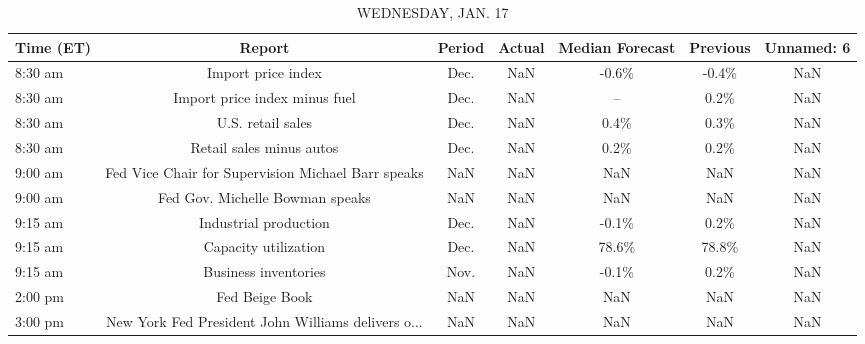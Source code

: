 \documentclass{article}%
\begin{document}
\begin{table}[htbp]%
\caption{WEDNESDAY, JAN. 17}%
\centering%
\begin{adjustbox}{width=1\textwidth}%
\begin{tabular}{lcccccc}
\toprule
Time (ET) &                                             Report & Period & Actual & Median Forecast & Previous & Unnamed: 6 \\
\midrule
  8:30 am &                                 Import price index &   Dec. &    NaN &           -0.6\% &    -0.4\% &        NaN \\
  8:30 am &                      Import price index minus fuel &   Dec. &    NaN &              -- &     0.2\% &        NaN \\
  8:30 am &                                  U.S. retail sales &   Dec. &    NaN &            0.4\% &     0.3\% &        NaN \\
  8:30 am &                           Retail sales minus autos &   Dec. &    NaN &            0.2\% &     0.2\% &        NaN \\
  9:00 am & Fed Vice Chair for Supervision Michael Barr speaks &    NaN &    NaN &             NaN &      NaN &        NaN \\
  9:00 am &                    Fed Gov. Michelle Bowman speaks &    NaN &    NaN &             NaN &      NaN &        NaN \\
  9:15 am &                              Industrial production &   Dec. &    NaN &           -0.1\% &     0.2\% &        NaN \\
  9:15 am &                               Capacity utilization &   Dec. &    NaN &           78.6\% &    78.8\% &        NaN \\
  9:15 am &                               Business inventories &   Nov. &    NaN &           -0.1\% &     0.2\% &        NaN \\
  2:00 pm &                                     Fed Beige Book &    NaN &    NaN &             NaN &      NaN &        NaN \\
  3:00 pm & New York Fed President John Williams delivers o... &    NaN &    NaN &             NaN &      NaN &        NaN \\
\bottomrule
\end{tabular}
%
\end{adjustbox}%
\end{table}

%
\end{document}

